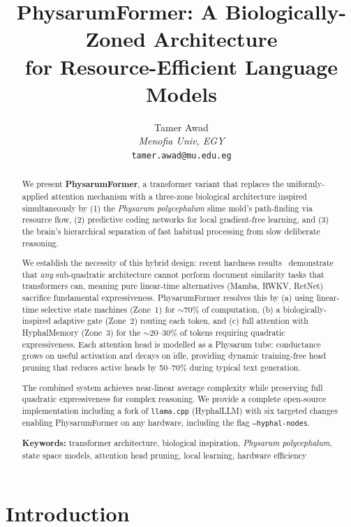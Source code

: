 \documentclass[11pt]{article}
\title{\textbf{PhysarumFormer}: A Biologically-Zoned Architecture\\
for Resource-Efficient Language Models}
\author{
  Tamer Awad\\
  \textit{Menofia Univ, EGY}\\
  \texttt{tamer.awad@mu.edu.eg}
}
\date{}
\begin{document}
\maketitle

\begin{abstract}
We present \textbf{PhysarumFormer}, a transformer variant that replaces the uniformly-applied attention mechanism with a three-zone biological architecture inspired simultaneously by (1) the \textit{Physarum polycephalum} slime mold's path-finding via resource flow, (2) predictive coding networks for local gradient-free learning, and (3) the brain's hierarchical separation of fast habitual processing from slow deliberate reasoning.

We establish the necessity of this hybrid design: recent hardness results~\cite{alman2025limitations} demonstrate that \emph{any} sub-quadratic architecture cannot perform document similarity tasks that transformers can, meaning pure linear-time alternatives (Mamba, RWKV, RetNet) sacrifice fundamental expressiveness. PhysarumFormer resolves this by (a) using linear-time selective state machines (Zone~1) for $\sim$70\% of computation, (b) a biologically-inspired adaptive gate (Zone~2) routing each token, and (c) full attention with HyphalMemory (Zone~3) for the $\sim$20--30\% of tokens requiring quadratic expressiveness. Each attention head is modelled as a Physarum tube: conductance grows on useful activation and decays on idle, providing dynamic training-free head pruning that reduces active heads by 50--70\% during typical text generation.

The combined system achieves near-linear average complexity while preserving full quadratic expressiveness for complex reasoning. We provide a complete open-source implementation including a fork of \texttt{llama.cpp} (HyphalLLM) with six targeted changes enabling PhysarumFormer on any hardware, including the flag \texttt{--hyphal-nodes}.

\smallskip
\noindent\textbf{Keywords:} transformer architecture, biological inspiration, \textit{Physarum polycephalum}, state space models, attention head pruning, local learning, hardware efficiency
\end{abstract}

\section{Introduction}
\label{sec:intro}
\end{document}
